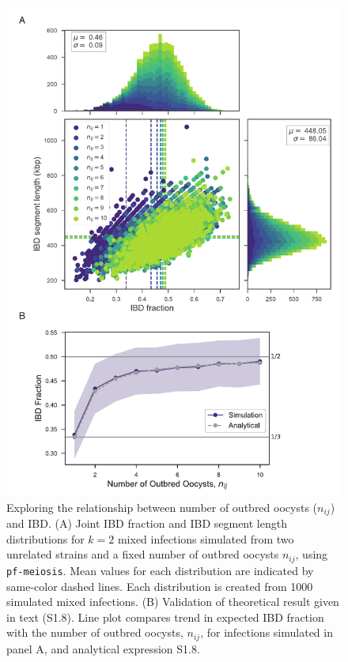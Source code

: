 \documentclass[9pt,lineno]{elife}
\begin{document}
\begin{figure}[pt]
  \centering{}
  \includegraphics[width = .75\textwidth]{supp-Fig1.pdf}
  \caption{Exploring the relationship between number of outbred oocysts ($n_{ij}$) and IBD. (A) Joint IBD fraction and IBD segment length distributions for $k=2$ mixed infections simulated from two unrelated strains and a fixed number of outbred oocysts $n_{ij}$, using \texttt{pf-meiosis}. Mean values for each distribution are indicated by same-color dashed lines. Each distribution is created from 1000 simulated mixed infections. (B) Validation of theoretical result given in text (S1.8). Line plot compares trend in expected IBD fraction with the number of outbred oocysts, $n_{ij}$, for infections simulated in panel A, and analytical expression S1.8.} \label{fig:validoocyst}
\end{figure}
\end{document}
